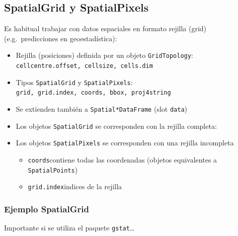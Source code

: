 \documentclass[
  spanish,
]{book}
\theoremstyle{break}
\theoremstyle{definition}
\theoremstyle{definition}
\theoremstyle{definition}
\theoremstyle{definition}
\theoremstyle{remark}
\begin{document}
\hypertarget{spatialgrid-y-spatialpixels}{%
\subsection{SpatialGrid y SpatialPixels}\label{spatialgrid-y-spatialpixels}}

Es habitual trabajar con datos espaciales en formato
rejilla (grid) (e.g.~predicciones en geoestadística):

\begin{itemize}
\item
  Rejilla (posiciones) definida por un objeto \texttt{GridTopology}:
  \texttt{cellcentre.offset,\ cellsize,\ cells.dim}
\item
  Tipos \texttt{SpatialGrid} y \texttt{SpatialPixels}:
  \texttt{grid,\ grid.index,\ coords,\ bbox,\ proj4string}
\item
  Se extienden también a \texttt{Spatial*DataFrame} (slot \texttt{data})
\item
  Los objetos \texttt{SpatialGrid} se corresponden con la rejilla completa:
\item
  Los objetos \texttt{SpatialPixels} se corresponden con una rejilla
  incompleta

  \begin{itemize}
  \item
    \texttt{coords}contiene todas las coordenadas (objetos equivalentes a
    \texttt{SpatialPoints})
  \item
    \texttt{grid.index}indices de la rejilla
  \end{itemize}
\end{itemize}

\hypertarget{ejemplo-spatialgrid}{%
\subsubsection{Ejemplo SpatialGrid}\label{ejemplo-spatialgrid}}

Importante si se utiliza el paquete \texttt{gstat}\ldots{}
\end{document}
